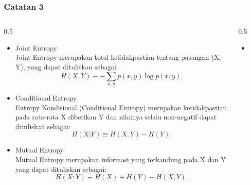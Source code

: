 \begin{frame}
    \frametitle{Catatan 3}
       \vspace*{-0.5cm}
  \begin{columns}[T]
  \small
    \begin{column}{0.5\textwidth}
        \begin{itemize} \justifying \tiny
            \item Joint Entropy\\
                Joint Entropy merupakan total ketidakpastian tentang pasangan (X, Y), yang dapat dituliskan sebagai: 
                    \begin{equation}
                        H(X, Y) \equiv -\sum_{x, y} p(x, y) \log p(x, y).
                    \end{equation}
            \item Conditional Entropy\\
                Entropy Kondisional (Conditional Entropy) merupakan ketidakpastian pada rata-rata X diberikan Y dan nilainya selalu non-negatif dapat dituliskan sebagai:
                    \begin{equation}
                         H(X|Y) \equiv H(X, Y) - H(Y).
                    \end{equation}
            \item Mutual Entropy\\
                Mutual Entropy merupakan informasi yang terkandung pada X dan Y yang dapat dituliskan sebagai:
                    \begin{equation}
                         H(X:Y) \equiv H(X) + H(Y) - H(X, Y).
                    \end{equation}
                
        \end{itemize}
    \end{column}

    \begin{column}{0.5\textwidth}
         \begin{itemize} \tiny \justifying
            \item -\\
                \begin{itemize}
                \tiny \justifying
                    \item[$\Rightarrow$] 
                \end{itemize}
            \end{itemize}    
    \end{column}
   \end{columns}   
\end{frame}

